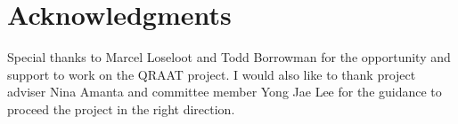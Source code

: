 \documentclass[twoside]{article}
\begin{document}

\section{Acknowledgments}
Special thanks to Marcel Loseloot and Todd Borrowman for the opportunity and support to work on the QRAAT project. I would also like to thank project adviser Nina Amanta and committee member Yong Jae Lee for the guidance to proceed the project in the right direction. 

\end{document}
